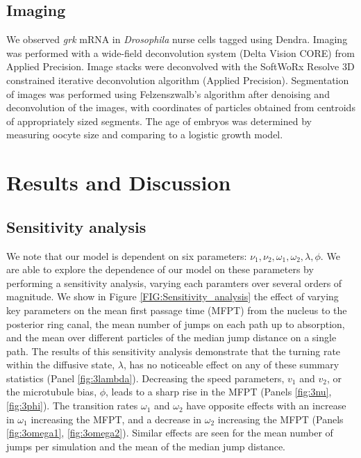 \documentclass[twocolumn]{biophys}
\begin{document}
\subsection{Imaging}
We observed \textit{grk} mRNA in \textit{Drosophila} nurse cells tagged using Dendra. 
Imaging was performed with a wide-field deconvolution system (Delta Vision CORE) from Applied Precision. 
Image stacks were deconvolved with the SoftWoRx Resolve 3D constrained iterative deconvolution algorithm (Applied Precision). 
Segmentation of images was performed using Felzenszwalb's algorithm \citep{felzenszwalb2004efficient} after denoising and deconvolution of the images, with coordinates of particles obtained from centroids of appropriately sized segments. 
The age of embryos was determined by measuring oocyte size and comparing to a logistic growth model.

\section{Results and Discussion} \label{Results}

\subsection{Sensitivity analysis}
We note that our model is dependent on six parameters: $\nu_1, \nu_2, \omega_1, \omega_2, \lambda, \phi$. 
We are able to explore the dependence of our model on these parameters by performing a sensitivity analysis, varying each paramters over several orders of magnitude.
We show  in Figure \ref{FIG:Sensitivity_analysis} the effect of varying key parameters on the mean first passage time (MFPT) from the nucleus to the posterior ring canal, the mean number of jumps on each path up to absorption, and the mean over different particles of the median jump distance on a single path.
The results of this sensitivity analysis demonstrate that the turning rate within the diffusive state, $\lambda$, has no noticeable effect on any of these summary statistics (Panel \ref{fig:3lambda}).
Decreasing the speed parameters, $v_1$ and $v_2$, or the microtubule bias, $\phi$, leads to a sharp rise in the MFPT (Panels \ref{fig:3nu}, \ref{fig:3phi}). 
The transition rates $\omega_1$ and $\omega_2$ have opposite effects with an increase in $\omega_1$ increasing the MFPT, and a decrease in $\omega_2$ increasing the MFPT (Panels \ref{fig:3omega1}, \ref{fig:3omega2}). 
Similar effects are seen for the mean number of jumps per simulation and the mean of the median jump distance.
\end{document}
